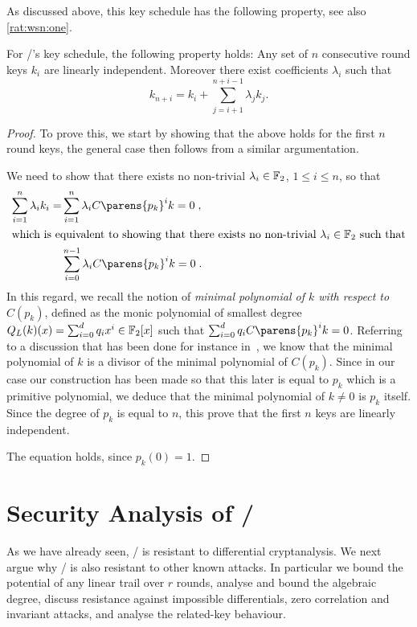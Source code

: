 As discussed above, this key schedule has the following property, see also \cref{rat:wsn:one}.
\begin{lemma}\label{bison:lem:ks}
    For \bison/'s key schedule, the following property holds:
    Any set of $n$ consecutive round keys $k_i$ are linearly independent.
    Moreover there exist coefficients $\lambda_i$ such that
        \begin{equation*}
            k_{n+i} = k_i + \sum_{j=i+1}^{n+i-1} \lambda_j k_j.
        \end{equation*}
\end{lemma}
\begin{proof}
    To prove this, we start by showing that the above holds for the first $n$ round keys, the general case then follows from a similar argumentation.

    We need to show that there exists no non-trivial $\lambda_i \in \mathbb{F}_2$, $1 \leqslant i \leqslant n$, so that
    \begin{align*}
        \sum_{i=1}^{n} \lambda_i k_i = &\sum_{i=1}^{n} \lambda_i C\parens{p_{k}}^i k = 0\;, \\
        \intertext{which is equivalent to showing that there exists no non-trivial $\lambda_i \in \F_2$ such that}
        &\sum_{i=0}^{n-1} \lambda_i C\parens{p_{k}}^i k = 0\;.
    \end{align*}
    In this regard, we recall the notion of \emph{minimal polynomial of $k$ with respect to $C(p_{k})$}, defined as the monic polynomial of smallest degree $Q_L(k)(x) = \sum_{i=0}^{d} q_i x^i \in \mathbb{F}_2[x]$  such that $\sum_{i=0}^{d} q_i C\parens{p_{k}}^i k = 0$.
    Referring to a discussion that has been done for instance in~\cite{C:BCLR17}, we know that the minimal polynomial of $k$ is a divisor of the minimal polynomial of $C(p_{k})$.
    Since in our case our construction has been made so that this later is equal to $p_k$ which is a primitive polynomial, we deduce that the minimal polynomial of $k \ne 0$ is $p_{k}$ itself.
    Since the degree of $p_{k}$ is equal to $n$, this prove that the first $n$ keys are linearly independent.

    The equation holds, since $p_k(0) = 1$.
\end{proof}

\section{Security Analysis of \bison/}\label{sec:bison:analysis}
As we have already seen, \bison/ is resistant to differential cryptanalysis.
We next argue why \bison/ is also resistant to other known attacks.
In particular we bound the potential of any linear trail over $r$ rounds, analyse and bound the algebraic degree, discuss resistance against impossible differentials, zero correlation and invariant attacks, and analyse the related-key behaviour.

